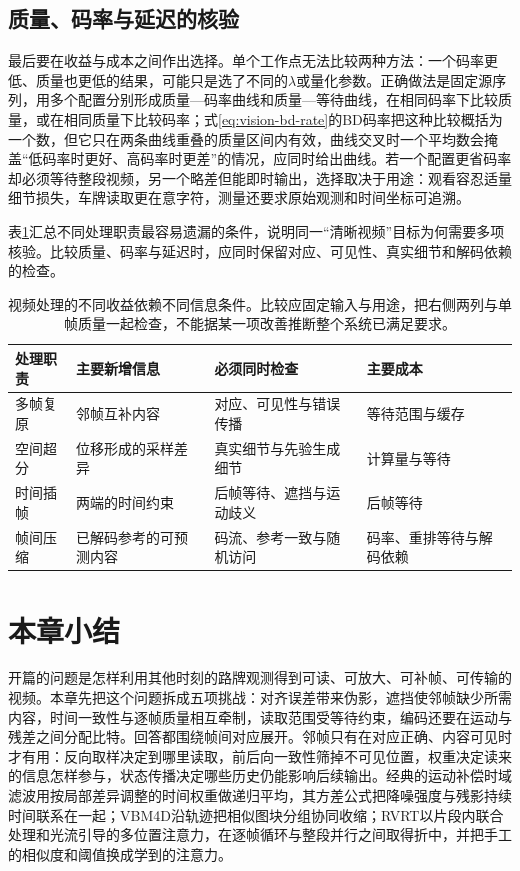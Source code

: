 \subsection{质量、码率与延迟的核验}
\label{sec:vision-video-quality-rate-latency}

最后要在收益与成本之间作出选择。单个工作点无法比较两种方法：一个码率更低、质量也更低的结果，可能只是选了不同的$\lambda$或量化参数。正确做法是固定源序列，用多个配置分别形成质量—码率曲线和质量—等待曲线，在相同码率下比较质量，或在相同质量下比较码率；式\eqref{eq:vision-bd-rate}的BD码率把这种比较概括为一个数，但它只在两条曲线重叠的质量区间内有效，曲线交叉时一个平均数会掩盖“低码率时更好、高码率时更差”的情况，应同时给出曲线。若一个配置更省码率却必须等待整段视频，另一个略差但能即时输出，选择取决于用途：观看容忍适量细节损失，车牌读取更在意字符，测量还要求原始观测和时间坐标可追溯。

表\ref{tab:vision-video-tradeoff}汇总不同处理职责最容易遗漏的条件，说明同一“清晰视频”目标为何需要多项核验。比较质量、码率与延迟时，应同时保留对应、可见性、真实细节和解码依赖的检查。

\begin{table}[htbp]
  \centering
  \begin{tabularx}{\linewidth}{@{}lXXX@{}}
    \toprule
    处理职责 & 主要新增信息 & 必须同时检查 & 主要成本\\
    \midrule
    多帧复原 & 邻帧互补内容 & 对应、可见性与错误传播 & 等待范围与缓存\\
    空间超分 & 位移形成的采样差异 & 真实细节与先验生成细节 & 计算量与等待\\
    时间插帧 & 两端的时间约束 & 后帧等待、遮挡与运动歧义 & 后帧等待\\
    帧间压缩 & 已解码参考的可预测内容 & 码流、参考一致与随机访问 & 码率、重排等待与解码依赖\\
    \bottomrule
  \end{tabularx}
  \caption{视频处理的不同收益依赖不同信息条件。比较应固定输入与用途，把右侧两列与单帧质量一起检查，不能据某一项改善推断整个系统已满足要求。}
  \label{tab:vision-video-tradeoff}
\end{table}
\FloatBarrier

\section{本章小结}
\label{sec:vision-video-restoration-summary}

开篇的问题是怎样利用其他时刻的路牌观测得到可读、可放大、可补帧、可传输的视频。本章先把这个问题拆成五项挑战：对齐误差带来伪影，遮挡使邻帧缺少所需内容，时间一致性与逐帧质量相互牵制，读取范围受等待约束，编码还要在运动与残差之间分配比特。回答都围绕帧间对应展开。邻帧只有在对应正确、内容可见时才有用：反向取样决定到哪里读取，前后向一致性筛掉不可见位置，权重决定读来的信息怎样参与，状态传播决定哪些历史仍能影响后续输出。经典的运动补偿时域滤波用按局部差异调整的时间权重做递归平均，其方差公式把降噪强度与残影持续时间联系在一起；VBM4D沿轨迹把相似图块分组协同收缩；RVRT以片段内联合处理和光流引导的多位置注意力，在逐帧循环与整段并行之间取得折中，并把手工的相似度和阈值换成学到的注意力。


